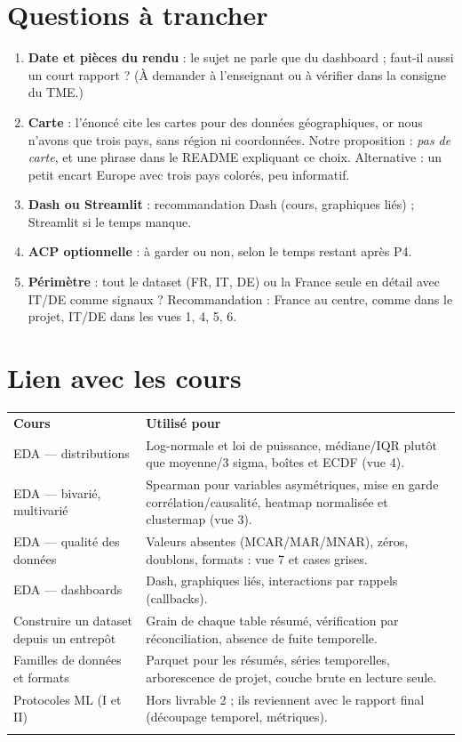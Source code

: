\documentclass[10.5pt, a4paper]{article}
\newcommand{\entete}[1]{\textbf{\color{gris!20!black}#1}}
\newcommand{\filet}{\arrayrulecolor{gris!40}\hline}
\begin{document}
\section{Questions à trancher}\label{sec:questions}

\begin{enumerate}
\item \textbf{Date et pièces du rendu} : le sujet ne parle que du dashboard ; faut-il aussi un court rapport ? (À demander à l'enseignant ou à vérifier dans la consigne du TME.)
\item \textbf{Carte} : l'énoncé cite les cartes pour des données géographiques, or nous n'avons que trois pays, sans région ni coordonnées.
Notre proposition : \emph{pas de carte}, et une phrase dans le README expliquant ce choix. Alternative : un petit encart Europe avec trois pays colorés, peu informatif.
\item \textbf{Dash ou Streamlit} : recommandation Dash (cours, graphiques liés) ; Streamlit si le temps manque.
\item \textbf{ACP optionnelle} : à garder ou non, selon le temps restant après P4.
\item \textbf{Périmètre} : tout le dataset (FR, IT, DE) ou la France seule en détail avec IT/DE comme signaux ? Recommandation : France au centre, comme dans le projet, IT/DE dans les vues 1, 4, 5, 6.
\end{enumerate}

\section{Lien avec les cours}

\begin{tabularx}{\linewidth}{>{\raggedright\arraybackslash}p{4.4cm} >{\raggedright\arraybackslash}X}
\rowcolor{gris!14}\entete{Cours} & \entete{Utilisé pour}\\
EDA --- distributions & Log-normale et loi de puissance, médiane/IQR plutôt que moyenne/3 sigma, boîtes et ECDF (vue 4). \\
EDA --- bivarié, multivarié & Spearman pour variables asymétriques, mise en garde corrélation/causalité, heatmap normalisée et clustermap (vue 3). \\
EDA --- qualité des données & Valeurs absentes (MCAR/MAR/MNAR), zéros, doublons, formats : vue 7 et cases grises. \\
EDA --- dashboards & Dash, graphiques liés, interactions par rappels (callbacks). \\
Construire un dataset depuis un entrepôt & Grain de chaque table résumé, vérification par réconciliation, absence de fuite temporelle. \\
Familles de données et formats & Parquet pour les résumés, séries temporelles, arborescence de projet, couche brute en lecture seule. \\
Protocoles ML (I et II) & Hors livrable 2 ; ils reviennent avec le rapport final (découpage temporel, métriques). \\
\filet
\end{tabularx}
\end{document}
